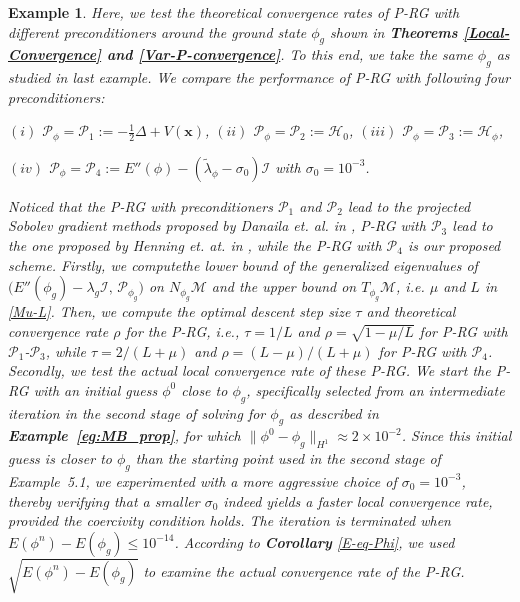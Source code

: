 \documentclass[preprint,3p]{elsarticle}
\newtheorem{exmp}{Example}[section]
\begin{document}
\begin{exmp}
	\label{eg:conv_rate_test}
	Here, we test the theoretical convergence rates of P-RG with different preconditioners around 
	the ground state $\phi_g$ shown in \textbf{ Theorems \ref{Local-Convergence} and  \ref{Var-P-convergence}}. 
	To this end, we take the same $\phi_g$ as  studied in last example. We  compare the performance of  
	P-RG  with following four  preconditioners:
	\item $(i)$ $\mathcal{P}_\phi=\mathcal{P}_1 := -\frac{1}{2}\Delta + V(\bm{x})$, $(ii)$ $\mathcal{P}_\phi=\mathcal{P}_2 := \mathcal{H}_0$, $(iii)$ $\mathcal{P}_\phi=\mathcal{P}_3 := \mathcal{H}_{\phi}$,
	\item  $(iv)$ $\mathcal{P}_\phi=\mathcal{P}_4 := E''(\phi) - (\widetilde{\lambda}_{\phi} - \sigma_0)\mathcal{I}$ with $\sigma_0 = 10^{-3}$.
	
	\vspace{0.2cm}
	
	Noticed that the P-RG with preconditioners $\mathcal{P}_1$ and $\mathcal{P}_2$  lead  to the projected Sobolev gradient methods proposed by Danaila et. al. in \cite{2010A, 2017Computation},
	P-RG with   $\mathcal{P}_3$ lead  to the one  proposed by Henning et. at.  in \cite{2020Sobolev},  while the P-RG with $\mathcal{P}_4$ is our proposed scheme. 
	Firstly, we computethe lower bound of the generalized eigenvalues of $\big(E''(\phi_g) - \lambda_g \mathcal{I},\, \mathcal{P}_{\phi_g}\big)$ on $N_{\phi_g}\mathcal{M}$ and the upper bound on $T_{\phi_g}\mathcal{M}$, i.e. $\mu$ and $L$ in \eqref{Mu-L}.
	Then, we  compute the optimal descent step size $\tau$ and theoretical convergence rate $\rho$ for the P-RG, i.e., 
	$\tau=1/L$ and $\rho=\sqrt{1-\mu/L}$  for P-RG with $\mathcal{P}_1$-$\mathcal{P}_3$, while
	$\tau=2/(L+\mu)$ and $\rho=(L-\mu)/(L+\mu)$ for  P-RG with $\mathcal{P}_4$.
	Secondly, we test the actual local convergence rate of these P-RG. We start the P-RG  with an initial guess $\phi^{0}$ close to  $\phi_g$, specifically selected from an intermediate iteration in the second stage of solving for $\phi_g$ as described in \textbf{Example~\ref{eg:MB_prop}}, 
	for which $\|\phi^{0} - \phi_g\|_{H^1}\approx2\times10^{-2}$. {Since this initial guess is closer to $\phi_g$ than the starting point used in the second stage of Example~5.1, we experimented with a more aggressive choice of $\sigma_0 = 10^{-3}$, thereby verifying that a smaller $\sigma_0$ indeed yields a faster local convergence rate, provided the coercivity condition holds.} The iteration is terminated when $E(\phi^n) - E(\phi_g) \le 10^{-14}$.
	According to \textbf{ Corollary} \ref{E-eq-Phi}, we used $\sqrt{E(\phi^n)-E(\phi_g)}$ to examine the actual convergence rate of the P-RG.

\end{exmp} 
\end{document}
